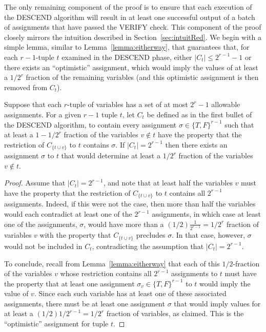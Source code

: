 \documentclass[final,12pt]{colt2018}
\begin{document}
The only remaining component of the proof is to ensure that each execution of the DESCEND algorithm will result in at least one successful output of a batch of assignments that have passed the VERIFY check.  This component of the proof closely mirrors the intuition described in Section~\ref{sec:intuitRed}.   We begin with a simple lemma, similar to Lemma~\ref{lemma:eitherway}, that guarantees that, for each $r-1$-tuple $t$ examined in the DESCEND phase, either $|C_t| \le 2^{r-1}-1$ or there exists an ``optimistic'' assignment, which would imply the values of at least a $1/2^r$ fraction of the remaining variables (and this optimistic assignment is then removed from $C_t$).

\begin{lemma}\label{lemma:eitherway2}
 Suppose that each $r$-tuple of variables has a set of at most $2^r-1$ allowable assignments.  For a given $r-1$ tuple $t$, let $C_t$ be defined as in the first bullet of the DESCEND algorithm, to contain every assignment $\sigma \in \{T,F\}^{r-1}$ such that at least a $1-1/2^r$ fraction of the variables $v \not \in t$ have the property that the restriction of $C_{\{t \cup v\}}$ to $t$ contains $\sigma.$  If $|C_t| = 2^{r-1}$ then there exists an assignment $\sigma$ to $t$ that would determine at least a $1/2^r$ fraction of the variables $v \not \in t$.
\end{lemma}
\begin{proof}
Assume that $|C_t|=2^{r-1}$, and note that at least half the variables $v$ must have the property that the restriction of $C_{\{t\cup v\}}$ to $t$ contains all $2^{r-1}$ assignments.  Indeed, if this were not the case, then more than half the variables would each contradict at least one of the $2^{r-1}$ assignments, in which case at least one of the assignments, $\sigma$, would have more than a $(1/2)\frac{1}{2^{r-1}}=1/2^r$ fraction of variables $v$ with the property that $C_{\{t \cup v\}}$ precludes $\sigma$.  In that case, however, $\sigma$ would not be included in $C_t$, contradicting the assumption that $|C_t|=2^{r-1}$.   

To conclude, recall from Lemma~\ref{lemma:eitherway} that each of this $1/2$-fraction of the variables $v$ whose restriction contains all $2^{r-1}$ assignments to $t$ must have the property that at least one assignment $\sigma_v \in \{T,F\}^{r-1}$ to $t$ would imply the value of $v$.  Since each such variable has at least one of these associated assignments, there must be at least one assignment $\sigma$ that would imply values for at least a $(1/2)1/2^{r-1}=1/2^r$ fraction of variables, as claimed.  This is the ``optimistic'' assignment for tuple $t$.
\end{proof}
\end{document}
